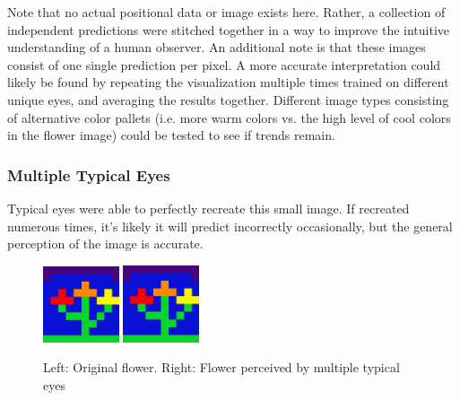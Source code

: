 \documentclass[titlepage]{article}
\begin{document}
Note that no actual positional data or image exists here. Rather, a collection of independent predictions were stitched together in a way to improve the intuitive understanding of a human observer. An additional note is that these images consist of one single prediction per pixel. A more accurate interpretation could likely be found by repeating the visualization multiple times trained on different unique eyes, and averaging the results together. Different image types consisting of alternative color pallets (i.e. more warm colors vs. the high level of cool colors in the flower image) could be tested to see if trends remain.

\subsubsection{Multiple Typical Eyes}

Typical eyes were able to perfectly recreate this small image. If recreated numerous times, it's likely it will predict incorrectly occasionally, but the general perception of the image is accurate. 

\begin{figure}[H]
    \centering
    \includegraphics[width=0.2\textwidth]{figs/original_flower.png}
    \includegraphics[width=0.2\textwidth]{figs/flower_normal.png}
    \caption{Left: Original flower. Right: Flower perceived by multiple typical eyes}
\end{figure}
\end{document}
